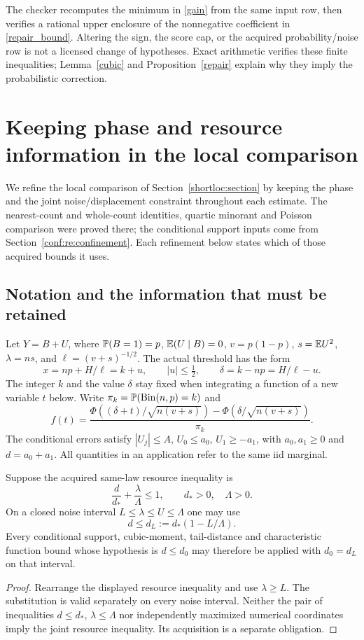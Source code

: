The checker recomputes the minimum in \eqref{gain} from the same input
row, then verifies a rational upper enclosure of the nonnegative
coefficient in \eqref{repair_bound}. Altering the sign, the score cap,
or the acquired probability/noise row is not a licensed change of
hypotheses. Exact arithmetic verifies these finite inequalities;
Lemma~\ref{cubic} and Proposition~\ref{repair} explain why they imply the
probabilistic correction.


\section{Keeping phase and resource information in the local comparison}

We refine the local comparison of Section~\ref{shortloc:section} by keeping
the phase and the joint noise/displacement constraint throughout each
estimate. The nearest-count and whole-count identities, quartic minorant
and Poisson comparison were proved there; the conditional support inputs
come from Section~\ref{conf:re:confinement}. Each refinement below states
which of those acquired bounds it uses.

\subsection{Notation and the information that must be retained}
Let $Y=B+U$, where $\mathbb P(B=1)=p$, $\mathbb E(U\mid B)=0$,
$v=p(1-p)$, $s=\mathbb E U^2$, $\lambda=ns$, and
$\ell=(v+s)^{-1/2}$. The actual threshold has the form
\[
 x=np+H/\ell=k+u,\qquad |u|\le\tfrac12,
 \qquad \delta=k-np=H/\ell-u.
\]
The integer $k$ and the value $\delta$ stay fixed when integrating a function
of a new variable $t$ below. Write $\pi_k=\mathbb P(\operatorname{Bin}(n,p)=k)$ and
\[
 f(t)=\frac{\Phi((\delta+t)/\sqrt{n(v+s)})-
                   \Phi(\delta/\sqrt{n(v+s)})}{\pi_k}.
\]
The conditional errors satisfy $|U_j|\le A$, $U_0\le a_0$,
$U_1\ge-a_1$, with $a_0,a_1\ge0$ and $d=a_0+a_1$.
All quantities in an application refer to the same iid marginal.

\begin{lemma}\label{lem:joint}
Suppose the acquired same-law resource inequality is
\[
        \frac d{d_*}+\frac\lambda\Lambda\le1,
        \qquad d_*>0,\quad\Lambda>0.
\]
On a closed noise interval $L\le\lambda\le U\le\Lambda$ one may use
\[
                d\le d_L:=d_*(1-L/\Lambda).
\]
Every conditional support, cubic-moment, tail-distance and characteristic
function bound whose hypothesis is $d\le d_0$ may therefore be applied with
$d_0=d_L$ on that interval.
\end{lemma}
\begin{proof}
Rearrange the displayed resource inequality and use $\lambda\ge L$.
The substitution is valid separately on every noise interval. Neither the
pair of inequalities $d\le d_*$, $\lambda\le\Lambda$ nor independently
maximized numerical coordinates imply the joint resource inequality.
Its acquisition is a separate obligation.
\end{proof}

